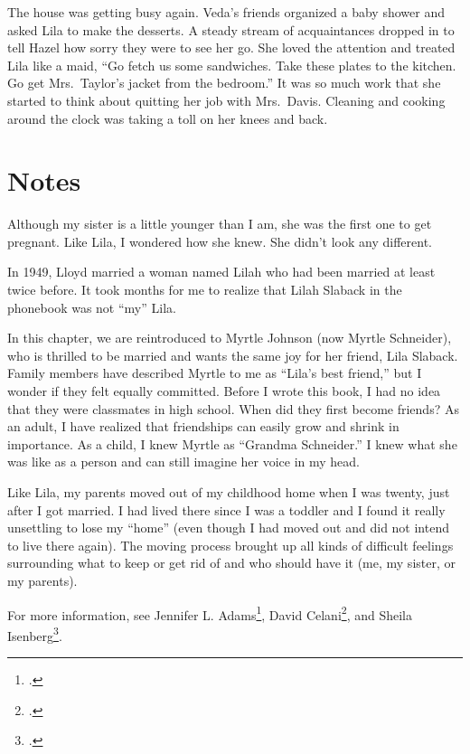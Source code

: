 \documentclass[
  letterpaper,
]{book}
\begin{document}
The house was getting busy again. Veda's friends organized a baby shower
and asked Lila to make the desserts. A steady stream of acquaintances
dropped in to tell Hazel how sorry they were to see her go. She loved
the attention and treated Lila like a maid, ``Go fetch us some
sandwiches. Take these plates to the kitchen. Go get Mrs.~Taylor's
jacket from the bedroom.'' It was so much work that she started to think
about quitting her job with Mrs.~Davis. Cleaning and cooking around the
clock was taking a toll on her knees and back.

\section{Notes}\label{notes-26}

Although my sister is a little younger than I am, she was the first one
to get pregnant. Like Lila, I wondered how she knew. She didn't look any
different.

In 1949, Lloyd married a woman named Lilah who had been married at least
twice before. It took months for me to realize that Lilah Slaback in the
phonebook was not ``my'' Lila.

In this chapter, we are reintroduced to Myrtle Johnson (now Myrtle
Schneider), who is thrilled to be married and wants the same joy for her
friend, Lila Slaback. Family members have described Myrtle to me as
``Lila's best friend,'' but I wonder if they felt equally committed.
Before I wrote this book, I had no idea that they were classmates in
high school. When did they first become friends? As an adult, I have
realized that friendships can easily grow and shrink in importance. As a
child, I knew Myrtle as ``Grandma Schneider.'' I knew what she was like
as a person and can still imagine her voice in my head.

Like Lila, my parents moved out of my childhood home when I was twenty,
just after I got married. I had lived there since I was a toddler and I
found it really unsettling to lose my ``home'' (even though I had moved
out and did not intend to live there again). The moving process brought
up all kinds of difficult feelings surrounding what to keep or get rid
of and who should have it (me, my sister, or my parents).

For more information, see Jennifer L. Adams\footnote{.}, David
Celani\footnote{.}, and Sheila Isenberg\footnote{.}.
\end{document}
